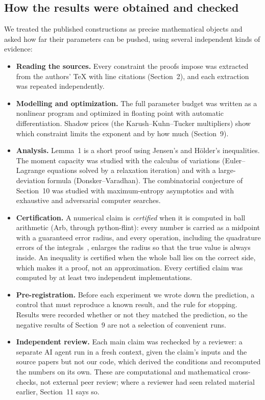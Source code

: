 \documentclass[11pt]{article}
\theoremstyle{plain}
\begin{document}
\subsection*{How the results were obtained and checked}
We treated the published constructions as precise mathematical objects and asked how far their parameters can be pushed, using several independent kinds of evidence:
\begin{itemize}
\item \textbf{Reading the sources.} Every constraint the proofs impose was extracted from the authors' \TeX{} with line citations (Section~2), and each extraction was repeated independently.
\item \textbf{Modelling and optimization.} The full parameter budget was written as a nonlinear program and optimized in floating point with automatic differentiation. Shadow prices (the Karush--Kuhn--Tucker multipliers) show which constraint limits the exponent and by how much (Section~9).
\item \textbf{Analysis.} Lemma~1 is a short proof using Jensen's and H\"older's inequalities. The moment capacity was studied with the calculus of variations (Euler--Lagrange equations solved by a relaxation iteration) and with a large-deviation formula (Donsker--Varadhan). The combinatorial conjecture of Section~10 was studied with maximum-entropy asymptotics and with exhaustive and adversarial computer searches.
\item \textbf{Certification.} A numerical claim is \emph{certified} when it is computed in ball arithmetic (Arb, through python-flint): every number is carried as a midpoint with a guaranteed error radius, and every operation, including the quadrature errors of the integrals~\cite{tw}, enlarges the radius so that the true value is always inside. An inequality is certified when the whole ball lies on the correct side, which makes it a proof, not an approximation. Every certified claim was computed by at least two independent implementations.
\item \textbf{Pre-registration.} Before each experiment we wrote down the prediction, a control that must reproduce a known result, and the rule for stopping. Results were recorded whether or not they matched the prediction, so the negative results of Section~9 are not a selection of convenient runs.
\item \textbf{Independent review.} Each main claim was rechecked by a reviewer: a separate AI agent run in a fresh context, given the claim's inputs and the source papers but not our code, which derived the conditions and recomputed the numbers on its own. These are computational and mathematical cross-checks, not external peer review; where a reviewer had seen related material earlier, Section~11 says so.
\end{itemize}
\end{document}
